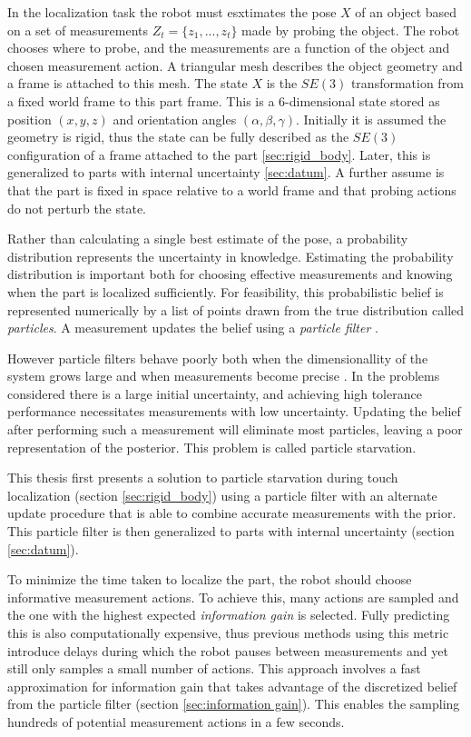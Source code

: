 \documentclass[../thesis.tex]{subfiles}
\begin{document}
In the localization task the robot must esxtimates the pose $X$ of an object based on a set of measurements $Z_t = \{z_1, ..., z_t\}$ made by probing the object.
The robot chooses where to probe, and the measurements are a function of the object and chosen measurement action.
A triangular mesh describes the object geometry and a frame is attached to this mesh. 
The state $X$ is the $SE(3)$ transformation from a fixed world frame to this part frame. 
This is a 6-dimensional state stored as position $(x,y,z)$ and orientation angles $(\alpha, \beta, \gamma)$. 
Initially it is assumed the geometry is rigid, thus the state can be fully described as the $SE(3)$ configuration of a frame attached to the part \ref{sec:rigid_body}.
Later, this is generalized to parts with internal uncertainty \ref{sec:datum}.
A further assume is that the part is fixed in space relative to a world frame and that probing actions do not perturb the state. 

Rather than calculating a single best estimate of the pose, a probability distribution represents the uncertainty in knowledge.
Estimating the probability distribution is important both for choosing effective measurements and knowing when the part is localized sufficiently. 
For feasibility, this probabilistic belief is represented numerically by a list of points drawn from the true distribution called \textit{particles}. 
A measurement updates the belief using a \textit{particle filter} \cite{Thrun2000a}.

However particle filters behave poorly both when the dimensionallity of the system grows large and when measurements become precise \cite{Koval2013}. 
In the problems considered there is a large initial uncertainty, and achieving high tolerance performance necessitates measurements with low uncertainty.
Updating the belief after performing such a measurement will eliminate most particles, leaving a poor representation of the posterior. This problem is called particle starvation.

This thesis first presents a solution to particle starvation during touch localization (section \ref{sec:rigid_body}) using a particle filter with an alternate update procedure that is able to combine accurate measurements with the prior. 
This particle filter is then generalized to parts with internal uncertainty (section \ref{sec:datum}).

To minimize the time taken to localize the part, the robot should choose informative measurement actions.
To achieve this, many actions are sampled and the one with the highest expected \textit{information gain} is selected. 
Fully predicting this is also computationally expensive, thus previous methods using this metric introduce delays during which the robot pauses between measurements and yet still only samples a small number of actions.
This approach involves a fast approximation for information gain that takes advantage of the discretized belief from the particle filter (section \ref{sec:information gain}). 
This enables the sampling hundreds of potential measurement actions in a few seconds. 
\end{document}
